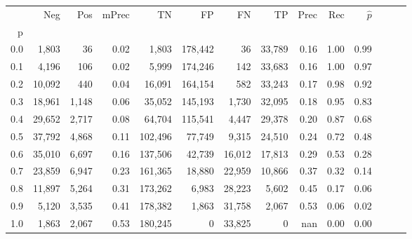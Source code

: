 \begin{tabular}{rrrrrrrrrrrrrr}
\toprule
{} &     Neg &    Pos & mPrec &       TN &       FP &      FN &      TP &  Prec &   Rec & $\hat{p}$ \\
p   &         &        &       &          &          &         &         &       &       &           \\
\midrule
0.0 &   1,803 &     36 &  0.02 &    1,803 &  178,442 &      36 &  33,789 &  0.16 &  1.00 &      0.99 \\
0.1 &   4,196 &    106 &  0.02 &    5,999 &  174,246 &     142 &  33,683 &  0.16 &  1.00 &      0.97 \\
0.2 &  10,092 &    440 &  0.04 &   16,091 &  164,154 &     582 &  33,243 &  0.17 &  0.98 &      0.92 \\
0.3 &  18,961 &  1,148 &  0.06 &   35,052 &  145,193 &   1,730 &  32,095 &  0.18 &  0.95 &      0.83 \\
0.4 &  29,652 &  2,717 &  0.08 &   64,704 &  115,541 &   4,447 &  29,378 &  0.20 &  0.87 &      0.68 \\
0.5 &  37,792 &  4,868 &  0.11 &  102,496 &   77,749 &   9,315 &  24,510 &  0.24 &  0.72 &      0.48 \\
0.6 &  35,010 &  6,697 &  0.16 &  137,506 &   42,739 &  16,012 &  17,813 &  0.29 &  0.53 &      0.28 \\
0.7 &  23,859 &  6,947 &  0.23 &  161,365 &   18,880 &  22,959 &  10,866 &  0.37 &  0.32 &      0.14 \\
0.8 &  11,897 &  5,264 &  0.31 &  173,262 &    6,983 &  28,223 &   5,602 &  0.45 &  0.17 &      0.06 \\
0.9 &   5,120 &  3,535 &  0.41 &  178,382 &    1,863 &  31,758 &   2,067 &  0.53 &  0.06 &      0.02 \\
1.0 &   1,863 &  2,067 &  0.53 &  180,245 &        0 &  33,825 &       0 &   nan &  0.00 &      0.00 \\
\bottomrule
\end{tabular}
